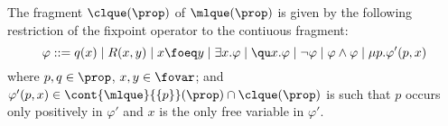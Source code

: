 \begin{definition}
The fragment $\clque(\prop)$ of $\mlque(\prop)$ is given by the following restriction of the fixpoint operator to the contiuous fragment:
{\small%
$$
\varphi ::= q(x) \mid R(x,y) \mid x \foeq y \mid \exists x.\varphi \mid \qu x.\varphi \mid \lnot\varphi \mid \varphi \land \varphi \mid \mu p.\varphi'(p,x)
$$}%
where $p,q\in\prop$, $x,y\in\fovar$; and $\varphi'(p,x) \in \cont{\mlque}{\{p\}}(\prop) \cap \clque(\prop)$ is such that $p$ occurs only positively in $\varphi'$ and $x$ is the only free variable in $\varphi'$.
\end{definition}

%
%
%
%
